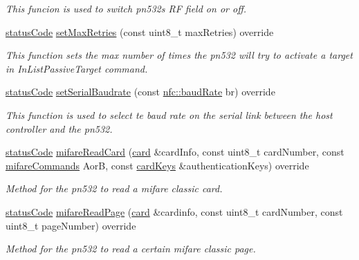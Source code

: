 \begin{DoxyCompactItemize}
\begin{DoxyCompactList}\small\item\em This funcion is used to switch pn532\textquotesingle{}s RF field on or off. \end{DoxyCompactList}\item 
\hyperlink{declarations_8h_ae1d20c5a38cae82ccaa6a77be3fd264b}{status\+Code} \hyperlink{classnfc_1_1PN532__chip_ae418a2f5fc2d4d344264fe2ec549f912}{set\+Max\+Retries} (const uint8\+\_\+t max\+Retries) override
\begin{DoxyCompactList}\small\item\em This function sets the max number of times the pn532 will try to activate a target in In\+List\+Passive\+Target command. \end{DoxyCompactList}\item 
\hyperlink{declarations_8h_ae1d20c5a38cae82ccaa6a77be3fd264b}{status\+Code} \hyperlink{classnfc_1_1PN532__chip_a4a524db2e74cbbe891378747f1f99c89}{set\+Serial\+Baudrate} (const \hyperlink{declarations_8h_a18236cb00569a8f612f8957044868f74}{nfc\+::baud\+Rate} br) override
\begin{DoxyCompactList}\small\item\em This function is used to select te baud rate on the serial link between the host controller and the pn532. \end{DoxyCompactList}\item 
\hyperlink{declarations_8h_ae1d20c5a38cae82ccaa6a77be3fd264b}{status\+Code} \hyperlink{classnfc_1_1PN532__chip_a6c6507959ad2d05236e0b08c7f9c6b48}{mifare\+Read\+Card} (\hyperlink{classcard}{card} \&card\+Info, const uint8\+\_\+t card\+Number, const \hyperlink{declarations_8h_a305b1a3bcfca65e2a82f0f9d24676835}{mifare\+Commands} AorB, const \hyperlink{structnfc_1_1cardKeys}{card\+Keys} \&authentication\+Keys) override
\begin{DoxyCompactList}\small\item\em Method for the pn532 to read a mifare classic card. \end{DoxyCompactList}\item 
\hyperlink{declarations_8h_ae1d20c5a38cae82ccaa6a77be3fd264b}{status\+Code} \hyperlink{classnfc_1_1PN532__chip_aa092e119cfa374603b5b7c9eaed9bcf6}{mifare\+Read\+Page} (\hyperlink{classcard}{card} \&cardinfo, const uint8\+\_\+t card\+Number, const uint8\+\_\+t page\+Number) override
\begin{DoxyCompactList}\small\item\em Method for the pn532 to read a certain mifare classic page. \end{DoxyCompactList}\item 

\end{DoxyCompactItemize}
